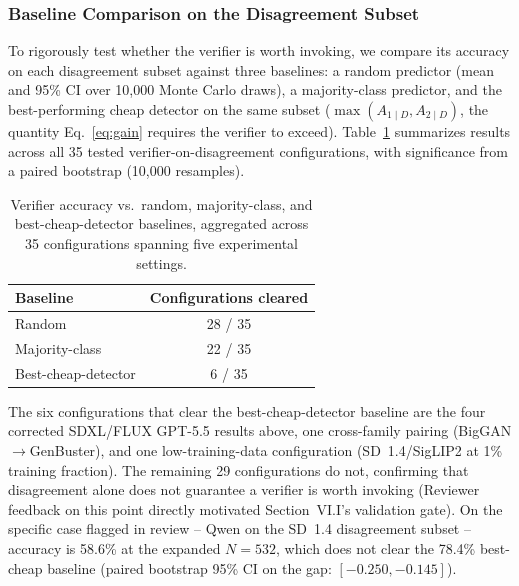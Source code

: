 
\subsubsection{Baseline Comparison on the Disagreement Subset}
\label{sec:baseline_comparison}

To rigorously test whether the verifier is worth invoking, we compare its
accuracy on each disagreement subset against three baselines: a random
predictor (mean and 95\% CI over 10{,}000 Monte Carlo draws), a
majority-class predictor, and the best-performing cheap detector on the
same subset ($\max(A_{1\mid D}, A_{2\mid D})$, the quantity
Eq.~\eqref{eq:gain} requires the verifier to exceed). Table~\ref{tab:baselines}
summarizes results across all 35 tested verifier-on-disagreement
configurations, with significance from a paired bootstrap (10{,}000
resamples).

\begin{table}[h]
\centering
\small
\caption{Verifier accuracy vs.\ random, majority-class, and best-cheap-detector baselines, aggregated across 35 configurations spanning five experimental settings.}
\label{tab:baselines}
\begin{tabular}{lc}
\toprule
Baseline & Configurations cleared \\
\midrule
Random          & 28 / 35 \\
Majority-class  & 22 / 35 \\
Best-cheap-detector & 6 / 35 \\
\bottomrule
\end{tabular}
\end{table}

The six configurations that clear the best-cheap-detector baseline are the
four corrected SDXL/FLUX GPT-5.5 results above, one cross-family pairing
(BigGAN$\to$GenBuster), and one low-training-data configuration
(SD~1.4/SigLIP2 at 1\% training fraction). The remaining 29 configurations
do not, confirming that disagreement alone does not guarantee a verifier is
worth invoking (Reviewer feedback on this point directly motivated
Section~VI.I's validation gate). On the specific case flagged in review --
Qwen on the SD~1.4 disagreement subset -- accuracy is 58.6\% at the expanded
$N{=}532$, which does not clear the 78.4\% best-cheap baseline (paired
bootstrap 95\% CI on the gap: $[-0.250,-0.145]$).


